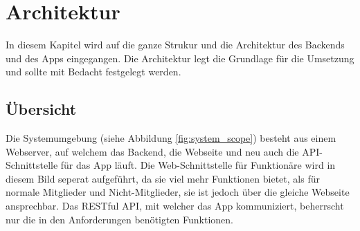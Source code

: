 %
%

\chapter{Architektur}\label{chap.architektur}
In diesem Kapitel wird auf die ganze Strukur und die Architektur des Backends und des Apps eingegangen. Die Architektur legt die Grundlage für die Umsetzung und sollte mit Bedacht festgelegt werden.

\section{Übersicht}\label{architektur_uebersicht}
Die Systemumgebung (siehe Abbildung \ref{fig:system_scope}) besteht aus einem Webserver, auf welchem das Backend, die Webseite und neu auch die API-Schnittstelle für das App läuft. Die Web-Schnittstelle für Funktionäre wird in diesem Bild seperat aufgeführt, da sie viel mehr Funktionen bietet, als für normale Mitglieder und Nicht-Mitglieder, sie ist jedoch über die gleiche Webseite ansprechbar. Das RESTful API, mit welcher das App kommuniziert, beherrscht nur die in den Anforderungen benötigten Funktionen.
